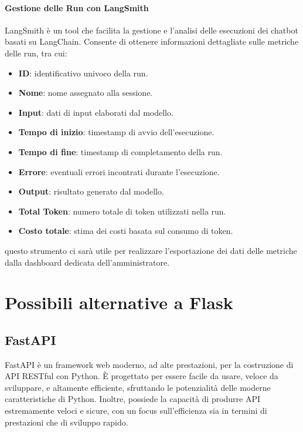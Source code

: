 \documentclass{article}
\begin{document}
\paragraph*{Gestione delle Run con LangSmith}
LangSmith è un tool che facilita la gestione e l'analisi delle esecuzioni dei chatbot basati su LangChain. 
Consente di ottenere informazioni dettagliate sulle metriche delle run, tra cui:
\begin{itemize}
    \item \textbf{ID}: identificativo univoco della run.
    \item \textbf{Nome}: nome assegnato alla sessione.
    \item \textbf{Input}: dati di input elaborati dal modello.
    \item \textbf{Tempo di inizio}: timestamp di avvio dell'esecuzione.
    \item \textbf{Tempo di fine}: timestamp di completamento della run.
    \item \textbf{Errore}: eventuali errori incontrati durante l'esecuzione.
    \item \textbf{Output}: risultato generato dal modello.
    \item \textbf{Total Token}: numero totale di token utilizzati nella run.
    \item \textbf{Costo totale}: stima dei costi basata sul consumo di token.
\end{itemize}

questo strumento ci sarà utile per realizzare l'esportazione dei dati delle metriche dalla dashboard dedicata dell'amministratore.



\section{Possibili alternative a Flask}

\subsection{FastAPI}
FastAPI è un framework web moderno, ad alte prestazioni, per la 
costruzione di API RESTful con Python. È progettato per essere facile 
da usare, veloce da sviluppare, e altamente efficiente, sfruttando 
le potenzialità delle moderne caratteristiche di Python. Inoltre, 
possiede la capacità di produrre API estremamente veloci e sicure, 
con un focus sull'efficienza sia in termini di prestazioni che di 
sviluppo rapido.
\end{document}
